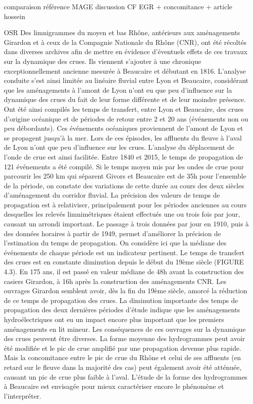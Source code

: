 \documentclass[11pt]{article}
\begin{document}
	comparaison référence MAGE
	discussion CF EGR + concomitance + article hossein

OSR
Des limnigrammes du moyen et bas
Rhône, antérieurs aux aménagements
Girardon et à ceux de la Compagnie Nationale
du Rhône (CNR), ont été récoltés dans
diverses archives afin de mettre en évidence
d’éventuels effets de ces travaux
sur la dynamique des crues. Ils viennent
s’ajouter à une chronique exceptionnellement
ancienne mesurée à Beaucaire et
débutant en 1816. L’analyse conduite s’est
ainsi limitée au linéaire fluvial entre Lyon
et Beaucaire, considérant que les aménagements
à l’amont de Lyon n’ont eu que
peu d’influence sur la dynamique des
crues du fait de leur forme différente et
de leur moindre présence.
Ont été ainsi compilés les temps de transfert,
entre Lyon et Beaucaire, des crues
d’origine océanique et de périodes de
retour entre 2 et 20 ans (événements
non ou peu débordants). Ces événements
océaniques proviennent de l’amont de
Lyon et se propagent jusqu’à la mer. Lors
de ces épisodes, les affluents du fleuve à
l’aval de Lyon n’ont que peu d’influence
sur les crues. L’analyse du déplacement
de l’onde de crue est ainsi facilitée.
Entre 1840 et 2015, le temps de propagation
de 121 événements a été compilé.
Si le temps moyen mis par les ondes
de crue pour parcourir les 250 km qui
séparent Givors et Beaucaire est de 35h
pour l’ensemble de la période, on constate
des variations de cette durée au cours des
deux siècles d’aménagement du corridor
fluvial. La précision des valeurs de temps
de propagation est à relativiser, principalement
pour les périodes anciennes
au cours desquelles les relevés limnimétriques
étaient effectués une ou trois fois
par jour, causant un arrondi important.
Le passage à trois données par jour en
1910, puis à des données horaires à partir
de 1949, permet d’améliorer la précision
de l’estimation du temps de propagation.
On considère ici que la médiane des événements
de chaque période est un indicateur
pertinent.
Le temps de transfert des crues est en
constante diminution depuis le début du
19ème siècle (FIGURE 4.3). En 175 ans, il est
passé en valeur médiane de 48h avant
la construction des casiers Girardon, à
16h après la construction des aménagements
CNR. Les ouvrages Girardon
semblent avoir, dès la fin du 19ème siècle,
amorcé la réduction de ce temps de propagation
des crues. La diminution importante
des temps de propagation des deux
dernières périodes d’étude indique que les
aménagements hydroélectriques ont eu
un impact encore plus important que les
premiers aménagements en lit mineur.
Les conséquences de ces ouvrages sur
la dynamique des crues peuvent être
diverses. La forme moyenne des hydrogrammes
peut avoir été modifiée et le
pic de crue amplifié par une propagation
devenue plus rapide. Mais la concomitance
entre le pic de crue du Rhône
et celui de ses affluents (en retard sur le
fleuve dans la majorité des cas) peut également
avoir été atténuée, causant un pic
de crue plus faible à l’aval. L’étude de la
forme des hydrogrammes à Beaucaire est
envisagée pour mieux caractériser encore
le phénomène et l’interpréter.
\end{document}
